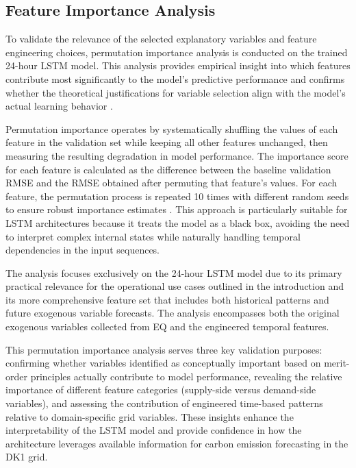 \subsection{Feature Importance Analysis}

To validate the relevance of the selected explanatory variables and feature engineering choices, permutation importance analysis is conducted on the trained 24-hour LSTM model. This analysis provides empirical insight into which features contribute most significantly to the model's predictive performance and confirms whether the theoretical justifications for variable selection align with the model's actual learning behavior \parencite{altmann2010}.

Permutation importance operates by systematically shuffling the values of each feature in the validation set while keeping all other features unchanged, then measuring the resulting degradation in model performance. The importance score for each feature is calculated as the difference between the baseline validation RMSE and the RMSE obtained after permuting that feature's values. For each feature, the permutation process is repeated 10 times with different random seeds to ensure robust importance estimates \parencite{altmann2010}. This approach is particularly suitable for LSTM architectures because it treats the model as a black box, avoiding the need to interpret complex internal states while naturally handling temporal dependencies in the input sequences.

The analysis focuses exclusively on the 24-hour LSTM model due to its primary practical relevance for the operational use cases outlined in the introduction and its more comprehensive feature set that includes both historical patterns and future exogenous variable forecasts. The analysis encompasses both the original exogenous variables collected from EQ and the engineered temporal features.

This permutation importance analysis serves three key validation purposes: confirming whether variables identified as conceptually important based on merit-order principles actually contribute to model performance, revealing the relative importance of different feature categories (supply-side versus demand-side variables), and assessing the contribution of engineered time-based patterns relative to domain-specific grid variables. These insights enhance the interpretability of the LSTM model and provide confidence in how the architecture leverages available information for carbon emission forecasting in the DK1 grid.

